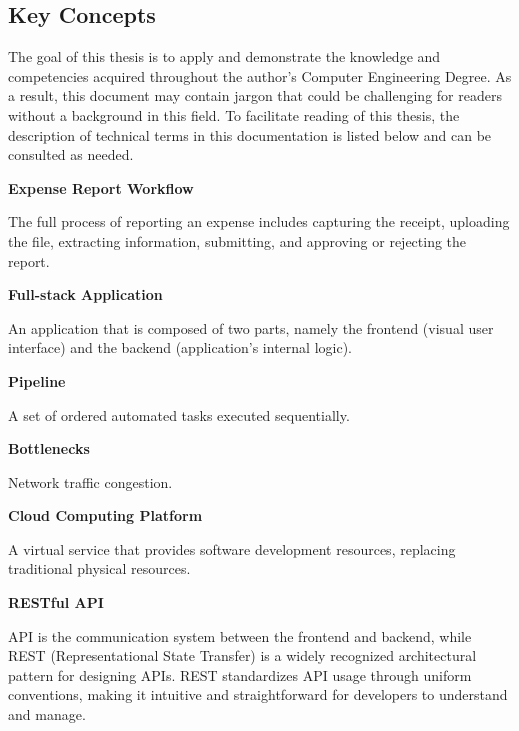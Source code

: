 \subsection{Key Concepts}

The goal of this thesis is to apply and demonstrate the knowledge and competencies acquired throughout the author's Computer Engineering Degree. As a result, this document may contain jargon that could be challenging for readers without a background in this field. To facilitate reading of this thesis, the description of technical terms in this documentation is listed below and can be consulted as needed. 


\textbf {Expense Report Workflow} 

The full process of reporting an expense includes capturing the receipt, uploading the file, extracting information, submitting, and approving or rejecting the report.

\textbf {Full-stack Application}

An application that is composed of two parts, namely the frontend (visual user interface) and the backend (application's internal logic).

\textbf {Pipeline}

A set of ordered automated tasks executed sequentially.

\textbf {Bottlenecks}

Network traffic congestion.

\newpage

\textbf {Cloud Computing Platform}

A virtual service that provides software development resources, replacing traditional physical resources. 

\textbf {RESTful API}

API is the communication system between the frontend and backend, while REST (Representational State Transfer) is a widely recognized architectural pattern for designing APIs. REST standardizes API usage through uniform conventions, making it intuitive and straightforward for developers to understand and manage.
